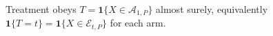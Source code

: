 Treatment obeys \(T=\mathbf1\{X\in\mathcal A_{1,P}\}\) almost surely, equivalently \(\mathbf1\{T=t\}=\mathbf1\{X\in\mathcal E_{t,P}\}\) for each arm.